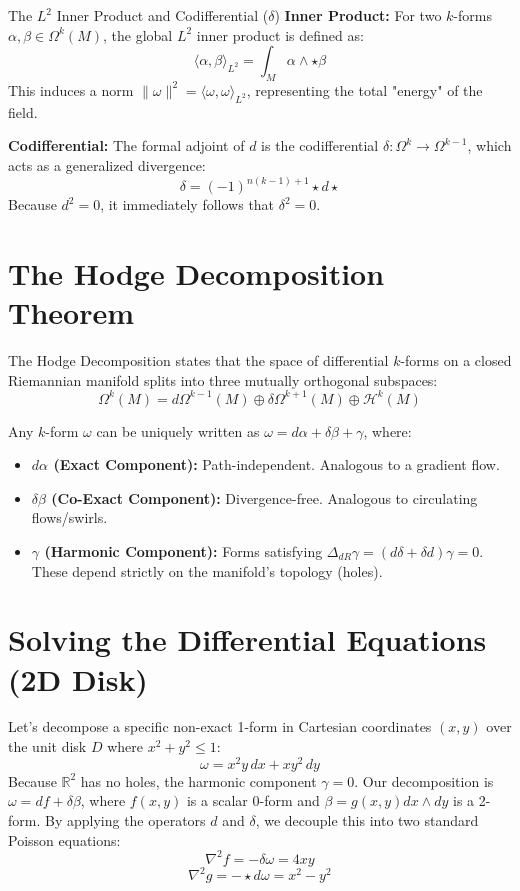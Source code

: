 \documentclass[11pt]{article}
\begin{document}
\begin{defbox}{The $L^2$ Inner Product and Codifferential ($\delta$)}
\textbf{Inner Product:} For two $k$-forms $\alpha, \beta \in \Omega^k(M)$, the global $L^2$ inner product is defined as:
\[ \langle \alpha, \beta \rangle_{L^2} = \int_M \alpha \wedge \star\beta \]
This induces a norm $\|\omega\|^2 = \langle \omega, \omega \rangle_{L^2}$, representing the total "energy" of the field.

\textbf{Codifferential:} The formal adjoint of $d$ is the codifferential $\delta: \Omega^k \to \Omega^{k-1}$, which acts as a generalized divergence:
\[ \delta = (-1)^{n(k-1)+1} \star d \star \]
Because $d^2 = 0$, it immediately follows that $\delta^2 = 0$.
\end{defbox}

\section{The Hodge Decomposition Theorem}
The Hodge Decomposition states that the space of differential $k$-forms on a closed Riemannian manifold splits into three mutually orthogonal subspaces:
\[ \Omega^k(M) = d\Omega^{k-1}(M) \oplus \delta\Omega^{k+1}(M) \oplus \mathcal{H}^k(M) \]

Any $k$-form $\omega$ can be uniquely written as $\omega = d\alpha + \delta\beta + \gamma$, where:
\begin{itemize}[noitemsep]
    \item \textbf{$d\alpha$ (Exact Component):} Path-independent. Analogous to a gradient flow.
    \item \textbf{$\delta\beta$ (Co-Exact Component):} Divergence-free. Analogous to circulating flows/swirls.
    \item \textbf{$\gamma$ (Harmonic Component):} Forms satisfying $\Delta_{dR} \gamma = (d\delta + \delta d)\gamma = 0$. These depend strictly on the manifold's topology (holes).
\end{itemize}

\section{Solving the Differential Equations (2D Disk)}
Let's decompose a specific non-exact 1-form in Cartesian coordinates $(x,y)$ over the unit disk $D$ where $x^2 + y^2 \le 1$:
\[ \omega = x^2y \, dx + xy^2 \, dy \]
Because $\mathbb{R}^2$ has no holes, the harmonic component $\gamma = 0$. Our decomposition is $\omega = df + \delta\beta$, where $f(x,y)$ is a scalar 0-form and $\beta = g(x,y) dx \wedge dy$ is a 2-form. By applying the operators $d$ and $\delta$, we decouple this into two standard Poisson equations:
\[ \nabla^2 f = -\delta\omega = 4xy \]
\[ \nabla^2 g = -\star d\omega = x^2 - y^2 \]
\end{document}
